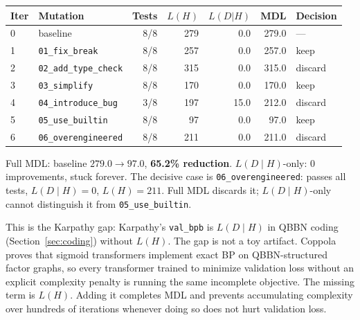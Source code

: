 \begin{center}
\begin{tabular}{llrrrrl}
\toprule
Iter & Mutation & Tests & $L(H)$ & $L(D|H)$ & MDL & Decision \\
\midrule
0 & baseline                      & 8/8 & 279 &  0.0 & 279.0 & --- \\
1 & \texttt{01\_fix\_break}        & 8/8 & 257 &  0.0 & 257.0 & keep \\
2 & \texttt{02\_add\_type\_check}  & 8/8 & 315 &  0.0 & 315.0 & discard \\
3 & \texttt{03\_simplify}          & 8/8 & 170 &  0.0 & 170.0 & keep \\
4 & \texttt{04\_introduce\_bug}    & 3/8 & 197 & 15.0 & 212.0 & discard \\
5 & \texttt{05\_use\_builtin}      & 8/8 &  97 &  0.0 &  97.0 & keep \\
6 & \texttt{06\_overengineered}    & 8/8 & 211 &  0.0 & 211.0 & discard \\
\bottomrule
\end{tabular}
\end{center}

Full MDL: baseline $279.0 \to 97.0$, \textbf{65.2\% reduction}.
$L(D \mid H)$-only: 0 improvements, stuck forever. The decisive case
is \texttt{06\_overengineered}: passes all tests, $L(D \mid H) = 0$,
$L(H) = 211$. Full MDL discards it; $L(D \mid H)$-only cannot
distinguish it from \texttt{05\_use\_builtin}.

This is the Karpathy gap: Karpathy's \texttt{val\_bpb} is
$L(D \mid H)$ in QBBN coding (Section~\ref{sec:coding}) without
$L(H)$. The gap is not a toy artifact. Coppola~\cite{coppola2026}
proves that sigmoid transformers implement exact BP on
QBBN-structured factor graphs, so every transformer trained to minimize
validation loss without an explicit complexity penalty is running the
same incomplete objective. The missing term is $L(H)$. Adding it
completes MDL and prevents accumulating complexity over hundreds of
iterations whenever doing so does not hurt validation loss.